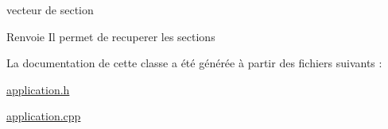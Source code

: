 vecteur de section 

\begin{DoxyReturn}{Renvoie}
Il permet de recuperer les sections 
\end{DoxyReturn}


La documentation de cette classe a été générée à partir des fichiers suivants \+:\begin{DoxyCompactItemize}
\item 
\hyperlink{application_8h}{application.\+h}\item 
\hyperlink{application_8cpp}{application.\+cpp}\end{DoxyCompactItemize}

